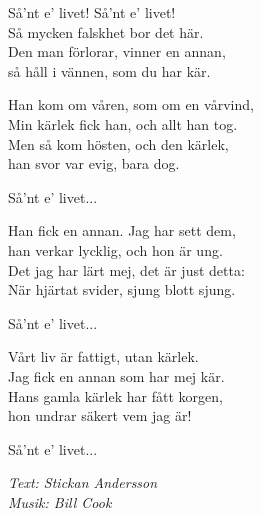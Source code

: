 \vspace{10pt}
Så'nt e' livet! Så'nt e' livet!\\
Så mycken falskhet bor det här.\\
Den man förlorar, vinner en annan,\\
så håll i vännen, som du har kär.\par
\vspace{10pt}
Han kom om våren, som om en vårvind,\\
Min kärlek fick han, och allt han tog.\\
Men så kom hösten, och den kärlek,\\
han svor var evig, bara dog.\par
\vspace{10pt}
Så'nt e' livet...\par
\vspace{10pt}
Han fick en annan. Jag har sett dem,\\
han verkar lycklig, och hon är ung.\\
Det jag har lärt mej, det är just detta:\\
När hjärtat svider, sjung blott sjung.\par
\vspace{10pt}
Så'nt e' livet...\par
\vspace{10pt}
Vårt liv är fattigt, utan kärlek.\\
Jag fick en annan som har mej kär.\\
Hans gamla kärlek har fått korgen,\\
hon undrar säkert vem jag är!\par
\vspace{10pt}
Så'nt e' livet...
\par
\vspace{10pt}
{\footnotesize\textit{Text: Stickan Andersson\\Musik: Bill Cook}}
